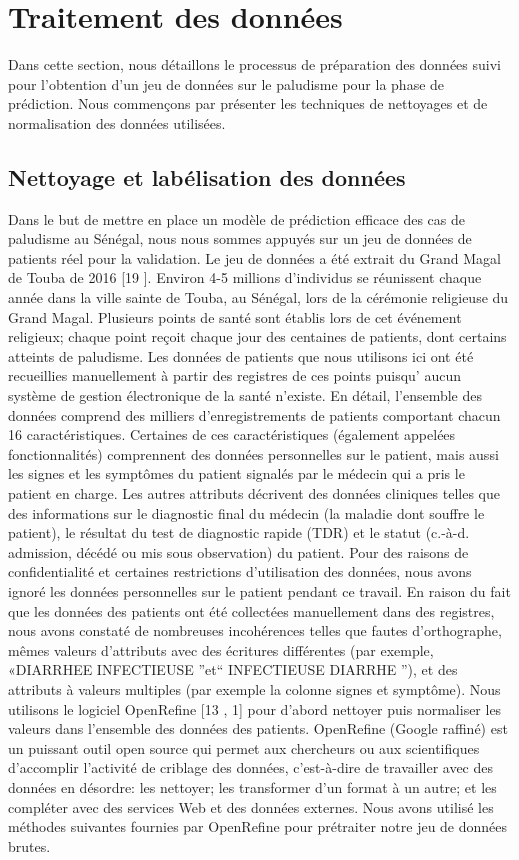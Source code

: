 \section{Traitement des données}\label{Traitement des données}
Dans cette section, nous détaillons le processus de préparation des données suivi pour l’obtention d’un jeu de données sur le paludisme pour la phase de prédiction. Nous commençons par présenter les techniques de nettoyages et de normalisation des données utilisées.
\subsection{Nettoyage et labélisation des données}
Dans le but de mettre en place un modèle de prédiction efficace des cas de paludisme au Sénégal, nous nous sommes appuyés sur un jeu de données de patients réel pour la validation. Le jeu de données a été extrait du Grand Magal de Touba de 2016 [19 ]. Environ 4-5 millions d'individus se réunissent chaque année dans la ville sainte de Touba, au Sénégal, lors de la cérémonie religieuse du Grand Magal. Plusieurs points de santé sont établis lors de cet événement religieux; chaque point reçoit chaque jour des centaines de patients, dont certains atteints de paludisme. Les données de patients que nous utilisons ici ont été recueillies manuellement à partir des registres de ces points puisqu’ aucun système de gestion électronique de la santé n’existe. En détail, l’ensemble des données comprend des milliers d’enregistrements de patients comportant chacun 16 caractéristiques. Certaines de ces caractéristiques (également appelées fonctionnalités) comprennent des données personnelles sur le patient, mais aussi les signes et les symptômes du patient signalés par le médecin qui a pris le patient en charge. Les autres attributs décrivent des données cliniques telles que des informations sur le diagnostic final du médecin (la maladie dont souffre le patient), le résultat du test de diagnostic rapide (TDR) et le statut (c.-à-d. admission, décédé ou mis sous observation) du patient. Pour des raisons de confidentialité et certaines restrictions d’utilisation des données, nous avons ignoré les données personnelles sur le patient pendant ce travail. En raison du fait que les données des patients ont été collectées manuellement dans des registres, nous avons constaté de nombreuses incohérences telles que fautes d'orthographe, mêmes valeurs d'attributs avec des écritures différentes (par exemple, «DIARRHEE INFECTIEUSE ”et“ INFECTIEUSE DIARRHE ”), et des attributs à valeurs multiples (par exemple la colonne signes et symptôme). Nous utilisons le logiciel OpenRefine [13 , 1] pour d’abord nettoyer  puis normaliser les valeurs dans l'ensemble des données  des patients. OpenRefine (Google raffiné) est un puissant outil open source qui permet aux chercheurs ou aux scientifiques d’accomplir l’activité de criblage des données, c’est-à-dire  de travailler avec des données en désordre: les nettoyer; les transformer d'un format à un autre; et les compléter avec des services Web et des données externes. Nous avons utilisé les méthodes suivantes fournies par OpenRefine pour prétraiter notre jeu de données brutes.
